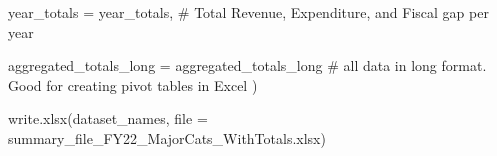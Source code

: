 \documentclass[
  letterpaper,
  DIV=11,
  numbers=noendperiod]{scrreport}
\newenvironment{Shaded}{\begin{snugshade}}{\end{snugshade}}
\newcommand{\AttributeTok}[1]{\textcolor[rgb]{0.40,0.45,0.13}{#1}}
\newcommand{\CommentTok}[1]{\textcolor[rgb]{0.37,0.37,0.37}{#1}}
\newcommand{\FunctionTok}[1]{\textcolor[rgb]{0.28,0.35,0.67}{#1}}
\newcommand{\NormalTok}[1]{\textcolor[rgb]{0.00,0.23,0.31}{#1}}
\newcommand{\OtherTok}[1]{\textcolor[rgb]{0.00,0.23,0.31}{#1}}
\newcommand{\StringTok}[1]{\textcolor[rgb]{0.13,0.47,0.30}{#1}}
\begin{document}
\begin{Shaded}
\begin{Highlighting}[]
                      \StringTok{\textquotesingle{}year\_totals\textquotesingle{}} \OtherTok{=}\NormalTok{ year\_totals,    }\CommentTok{\# Total Revenue, Expenditure, and Fiscal gap per year}
                      
                      \StringTok{\textquotesingle{}aggregated\_totals\_long\textquotesingle{}} \OtherTok{=}\NormalTok{ aggregated\_totals\_long }\CommentTok{\# all data in long format. Good for creating pivot tables in Excel}
\NormalTok{                      )}

\FunctionTok{write.xlsx}\NormalTok{(dataset\_names, }\AttributeTok{file =} \StringTok{\textquotesingle{}summary\_file\_FY22\_MajorCats\_WithTotals.xlsx\textquotesingle{}}\NormalTok{)}
\end{Highlighting}
\end{Shaded}




\printindex
\end{document}
